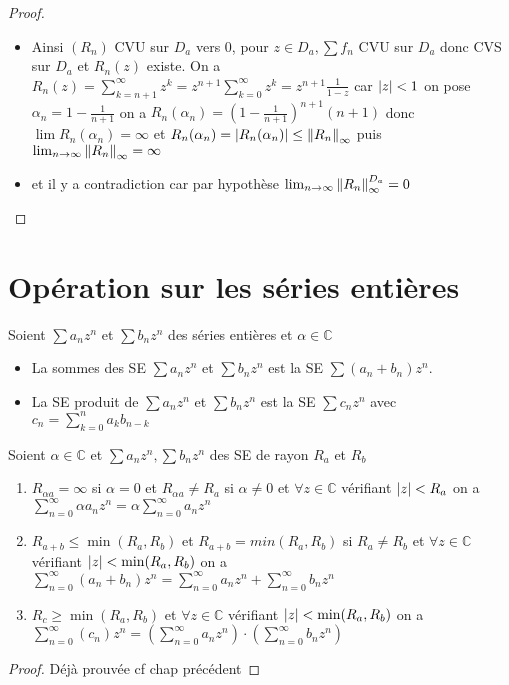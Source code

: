 \documentclass[11pt,hidelinks]{book}
\theoremstyle{mytheoremstyle}
\theoremstyle{mytheoremstyle}
\theoremstyle{mytheoremstyle}
\theoremstyle{mytheoremstyle}
\theoremstyle{mytheoremstyle}
\theoremstyle{mytheoremstyle}
\theoremstyle{mytheoremstyle}
\theoremstyle{mytheoremstyle}
\theoremstyle{myproblemstyle}
\def\mbb#1{\mathbb{#1}}
\def\bC{\mbb{C}}
\def\se{\sum a_n z^n}
\def\seb#1{\sum #1_n z^n}
\def\ln{\lim_{n \to \infty}}
\newcommand{\parenth}[1]{\left(#1\right)}
\begin{document}
\begin{adjustwidth}{-2em}{-1em}
\begin{rmq}
\begin{proof}
\begin{itemize}[label=$\circ$]
            \item Ainsi $(R_n)$ CVU sur $D_a$ vers $0$, 
            pour $z \in D_a, \sum f_n$ CVU sur $D_a$ donc CVS sur $D_a$ et $R_n(z)$ existe.
            On a $R_n(z) = \sum_{k=n+1}^{\infty} z^k = z^{n+1} \sum_{k=0}^{\infty} z^k = z^{n+1} \frac{1}{1-z}$ car $\abs{z} < 1$
            on pose $\alpha_n = 1 - \frac{1}{n+1}$ on a $R_n(\alpha_n) = \parenth{1 - \frac{1}{n+1}}^{n+1} (n+1)$
            donc $\lim R_n(\alpha_n) = \infty$
            et $R_n(\alpha_n) = \abs{R_n(\alpha_n)} \leq \norm{R_n}_{\infty}$ puis $\ln \norm{R_n}_{\infty} = \infty$ 
            \item et il y a contradiction car par hypothèse $\ln \norm{R_n}_{\infty}^{D_a} = 0$
            \end{itemize}
        \end{proof}
    \end{rmq}
\end{adjustwidth}
\section{Opération sur les séries entières}
\begin{definition}
    Soient $\se$ et $\seb{b}$ des séries entières et $\alpha \in \bC$
    \begin{itemize}[label=$\circ$]
    \item La sommes des SE $\se$ et $\seb{b}$ est la SE $\sum (a_n + b_n) z^n$. 
    \item La SE produit de $\se$ et $\seb{b}$ est la SE $\seb{c}$ avec $c_n = \sum_{k=0}^n a_k b_{n-k}$
    \end{itemize}
\end{definition}
\begin{adjustwidth}{-2em}{-1em}
    \begin{prop}
        Soient $\alpha \in \bC$ et $\se, \seb{b}$ des SE de rayon $R_a$ et $R_b$
        \newline 
        \begin{enumerate}
            \item $R_{\alpha a} = \infty$ si $\alpha = 0$ et $R_{\alpha a} \not= R_a$ si $\alpha \not= 0$
            et $\forall z \in \bC$ vérifiant $\abs{z} < R_a$ on a $\sum_{n=0}^{\infty} \alpha a_n z^n = \alpha \sum_{n=0}^{\infty} a_n z^n$
            \item $R_{a+b} \leq \min(R_a,R_b)$ et $R_{a+b} = min(R_a, R_b)$ si $R_a \not= R_b$
            et $\forall z \in \bC$ vérifiant $\abs{z} < \min(R_a,R_b)$ on a $\sum_{n=0}^{\infty} (a_n+b_n) z^n = \sum_{n=0}^{\infty} a_n z^n + \sum_{n=0}^{\infty} b_n z^n$
            \item $R_{c} \geq \min(R_a,R_b)$ 
            et $\forall z \in \bC$ vérifiant $\abs{z} < \min(R_a,R_b)$ on a $\sum_{n=0}^{\infty} (c_n) z^n = \parenth{\sum_{n=0}^{\infty} a_n z^n} \cdot \parenth{\sum_{n=0}^{\infty} b_n z^n}$
        \end{enumerate}
        \begin{proof}
            Déjà prouvée cf chap précédent
        \end{proof}
    \end{prop}
\end{adjustwidth}
\end{document}
